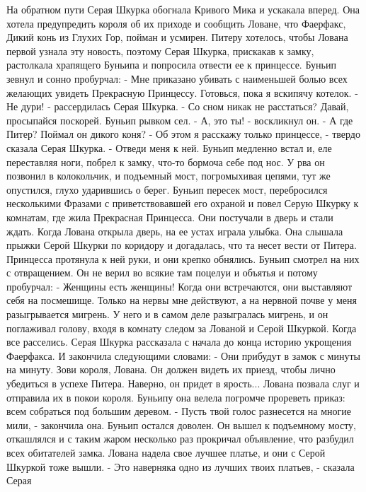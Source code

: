     На обратном пути Серая Шкурка обогнала Кривого Мика и ускакала 
вперед. Она хотела предупредить короля об их приходе и сообщить 
Ловане, что Фаерфакс, Дикий конь из Глухих Гор, пойман и усмирен. 
Питеру хотелось, чтобы Лована первой узнала эту новость, поэтому Серая 
Шкурка, прискакав к замку, растолкала храпящего Буньипа и попросила 
отвести ее к принцессе.
    Буньип зевнул и сонно пробурчал:
    - Мне приказано убивать с наименьшей болью всех желающих увидеть 
Прекрасную Принцессу. Готовься, пока я вскипячу котелок.
    - Не дури! - рассердилась Серая Шкурка. - Со сном никак не 
расстаться? Давай, просыпайся поскорей.
    Буньип рывком сел.
    - А, это ты! - воскликнул он. - А где Питер? Поймал он дикого 
коня?
    - Об этом я расскажу только принцессе, - твердо сказала Серая 
Шкурка. - Отведи меня к ней.
    Буньип медленно встал и, еле переставляя ноги, побрел к замку, 
что-то бормоча себе под нос. У рва он позвонил в колокольчик, и 
подъемный мост, погромыхивая цепями, тут же опустился, глухо 
ударившись о берег.
    Буньип пересек мост, перебросился несколькими Фразами с 
приветствовавшей его охраной и повел Серую Шкурку к комнатам, где жила 
Прекрасная Принцесса. Они постучали в дверь и стали ждать.
    Когда Лована открыла дверь, на ее устах играла улыбка. Она слышала 
прыжки Серой Шкурки по коридору и догадалась, что та несет вести от 
Питера. Принцесса протянула к ней руки, и они крепко обнялись.
    Буньип смотрел на них с отвращением. Он не верил во всякие там 
поцелуи и объятья и потому пробурчал:
    - Женщины есть женщины! Когда они встречаются, они выставляют себя 
на посмешище. Только на нервы мне действуют, а на нервной почве у меня 
разыгрывается мигрень.
    У него и в самом деле разыгралась мигрень, и он поглаживал голову, 
входя в комнату следом за Лованой и Серой Шкуркой.
    Когда все расселись. Серая Шкурка рассказала с начала до конца 
историю укрощения Фаерфакса. И закончила следующими словами:
    - Они прибудут в замок с минуты на минуту. Зови короля, Лована. Он 
должен видеть их приезд, чтобы лично убедиться в успехе Питера. 
Наверно, он придет в ярость...
    Лована позвала слуг и отправила их в покои короля. Буньипу она 
велела погромче прореветь приказ: всем собраться под большим деревом.
    - Пусть твой голос разнесется на многие мили, - закончила она.
    Буньип остался доволен. Он вышел к подъемному мосту, откашлялся и 
с таким жаром несколько раз прокричал объявление, что разбудил всех 
обитателей замка.
    Лована надела свое лучшее платье, и они с Серой Шкуркой тоже 
вышли.
    - Это наверняка одно из лучших твоих платьев, - сказала Серая 
